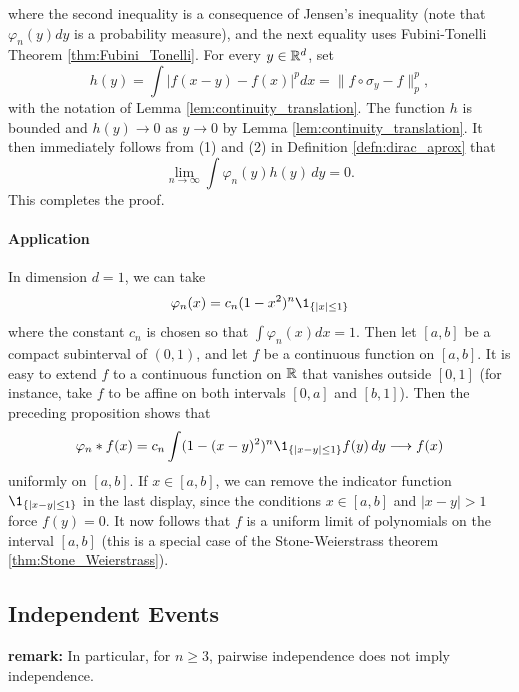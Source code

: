 \documentclass[../Main.tex]{subfiles}
\begin{document}
{\begin{enumerate}
where the second inequality is a consequence of Jensen's inequality (note that $\varphi_n(y)dy$ is a probability measure), and the next equality uses Fubini-Tonelli Theorem \ref{thm:Fubini_Tonelli}. For every $y \in \mathbb{R}^d$, set
\[ h(y) = \int |f(x-y)-f(x)|^p dx = \|f \circ \sigma_y - f\|_p^p, \]
with the notation of Lemma \ref{lem:continuity_translation}. The function $h$ is bounded and $h(y) \to 0$ as $y \to 0$ by Lemma \ref{lem:continuity_translation}. It then immediately follows from (1) and (2) in Definition \ref{defn:dirac_aprox} that
\[ \lim_{n \to \infty} \int \varphi_n(y)h(y)\,dy = 0. \]
This completes the proof.
\end{enumerate}

}

\paragraph{Application}
In dimension $d = 1$, we can take
\[
\varphi_n(x) = c_n(1 - x^2)^n \1_{\{|x|\leq 1\}}
\]
where the constant $c_n$ is chosen so that $\int \varphi_n(x)dx = 1$. Then let $[a,b]$ be a compact subinterval of $(0,1)$, and let $f$ be a continuous function on $[a,b]$. It is easy to extend $f$ to a continuous function on $\mathbb{R}$ that vanishes outside $[0,1]$ (for instance, take $f$ to be affine on both intervals $[0,a]$ and $[b,1]$). Then the preceding proposition shows that
\[
\varphi_n * f(x)
= c_n \int (1-(x-y)^2)^n \1_{\{|x-y|\leq 1\}} f(y)\,dy
\longrightarrow f(x)
\]
uniformly on $[a,b]$. If $x \in [a,b]$, we can remove the indicator function $\1_{\{|x-y|\leq 1\}}$ in the last display, since the conditions $x \in [a,b]$ and $|x-y|>1$ force $f(y)=0$. It now follows that $f$ is a uniform limit of polynomials on the interval $[a,b]$ (this is a special case of the Stone-Weierstrass theorem \ref{thm:Stone_Weierstrass}).



\subsection{Independent Events}

\textbf{remark:} In particular, for $n\ge3$, pairwise independence does not imply independence.
\end{document}
